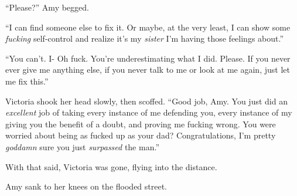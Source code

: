 ``Please?'' Amy begged.



``I can find someone else to fix it.  Or maybe, at the very least, I can show some \emph{fucking} self-control and realize it's my \emph{sister} I'm having those feelings about.''



``You can't.  I- Oh fuck.  You're underestimating what I did.  Please.  If you never ever give me anything else, if you never talk to me or look at me again, just let me fix this.''



Victoria shook her head slowly, then scoffed.  ``Good job, Amy.  You just did an \emph{excellent} job of taking every instance of me defending you, every instance of my giving you the benefit of a doubt, and proving me fucking wrong.  You were worried about being as fucked up as your dad?  Congratulations, I'm pretty \emph{goddamn} sure you just \emph{surpassed} the man.''



With that said, Victoria was gone, flying into the distance.



Amy sank to her knees on the flooded street.
